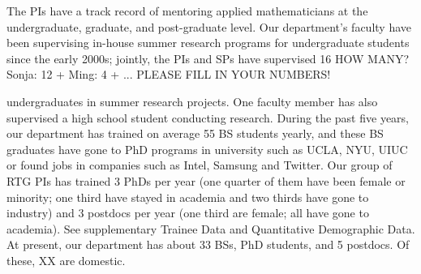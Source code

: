\documentclass[11pt]{NSFamsart}
\newcommand{\numUG}{33\xspace}
\newcommand{\numPostDoc}{5\xspace}
\begin{document}
The PIs have a track record of mentoring  applied mathematicians at the undergraduate, graduate, and post-graduate level. 
Our department's faculty have been supervising in-house summer research programs for undergraduate students since the early 2000s; jointly, the PIs and SPs have supervised 16 {\color{red}HOW MANY? Sonja: 12 + Ming: 4 + ... PLEASE FILL IN YOUR NUMBERS!}{
undergraduates in summer research projects. 
One faculty member has also supervised a high school student conducting research. 
During the past five years, our department has trained on average 55 BS students yearly, and these BS graduates have gone to PhD programs in university such as UCLA, NYU, UIUC or found jobs in companies such as Intel, Samsung and Twitter. Our group of RTG PIs has trained 3 PhDs per year (one quarter of them have been female or minority; one third have stayed in academia and two thirds have gone to industry)  and 3 postdocs per year (one third are female; all have gone to academia).  See supplementary Trainee Data and Quantitative Demographic Data. 
At present, our department has about \numUG BSs, \numPhD PhD students, and \numPostDoc postdocs. 
{\color{red}Of these, XX  are domestic. }


}
\end{document}
